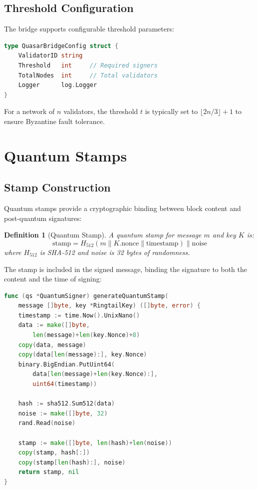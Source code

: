 \documentclass[11pt,a4paper]{article}
\newtheorem{definition}{Definition}
\begin{document}
\subsection{Threshold Configuration}

The bridge supports configurable threshold parameters:

\begin{lstlisting}[language=Go,caption={Quasar Bridge Configuration}]
type QuasarBridgeConfig struct {
    ValidatorID string
    Threshold   int     // Required signers
    TotalNodes  int     // Total validators
    Logger      log.Logger
}
\end{lstlisting}

For a network of $n$ validators, the threshold $t$ is typically set to $\lfloor 2n/3 \rfloor + 1$ to ensure Byzantine fault tolerance.

\section{Quantum Stamps}

\subsection{Stamp Construction}

Quantum stamps provide a cryptographic binding between block content and post-quantum signatures:

\begin{definition}[Quantum Stamp]
A quantum stamp for message $m$ and key $K$ is:
\[
\text{stamp} = H_{512}(m \| K.\text{nonce} \| \text{timestamp}) \| \text{noise}
\]
where $H_{512}$ is SHA-512 and noise is 32 bytes of randomness.
\end{definition}

The stamp is included in the signed message, binding the signature to both the content and the time of signing:

\begin{lstlisting}[language=Go,caption={Stamp Generation}]
func (qs *QuantumSigner) generateQuantumStamp(
    message []byte, key *RingtailKey) ([]byte, error) {
    timestamp := time.Now().UnixNano()
    data := make([]byte,
        len(message)+len(key.Nonce)+8)
    copy(data, message)
    copy(data[len(message):], key.Nonce)
    binary.BigEndian.PutUint64(
        data[len(message)+len(key.Nonce):],
        uint64(timestamp))

    hash := sha512.Sum512(data)
    noise := make([]byte, 32)
    rand.Read(noise)

    stamp := make([]byte, len(hash)+len(noise))
    copy(stamp, hash[:])
    copy(stamp[len(hash):], noise)
    return stamp, nil
}
\end{lstlisting}
\end{document}
